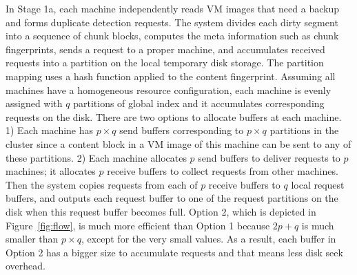 In Stage 1a, each machine independently reads  
VM images that need a backup
and forms duplicate  detection requests. 
The system divides  each dirty segment into a sequence of chunk blocks,  computes the meta 
information such as chunk fingerprints,  sends a request to a proper machine, and accumulates  
received requests into a partition on the local temporary disk storage. 
The partition mapping uses a hash function applied to the content fingerprint. 
Assuming all machines have a  homogeneous resource configuration, each machine is evenly  assigned with
$q$ partitions of global index and it accumulates corresponding requests on the disk. 
There are two options to allocate buffers at each machine. 
1) Each machine has  $p\times q$ send buffers corresponding to $p\times q$ partitions in the cluster
since a content block in a VM image of this machine can be sent to any of these partitions.
2) Each machine allocates $p$ send buffers to deliver requests to $p$ machines; it allocates 
$p$ receive buffers to collect requests  from other machines.
Then the system copies requests from each of $p$ receive buffers to  $q$ local request buffers,
and outputs each request buffer to one of the request partitions on the disk
when this request buffer becomes full.  Option 2, which is  depicted in Figure~\ref{fig:flow},
is much more efficient than Option 1 because $2p+q$ is much smaller than
$p\times q$, except for the very small  values. 
As a result, each buffer in Option 2 has a bigger size to accumulate requests and that means
less disk seek overhead.

